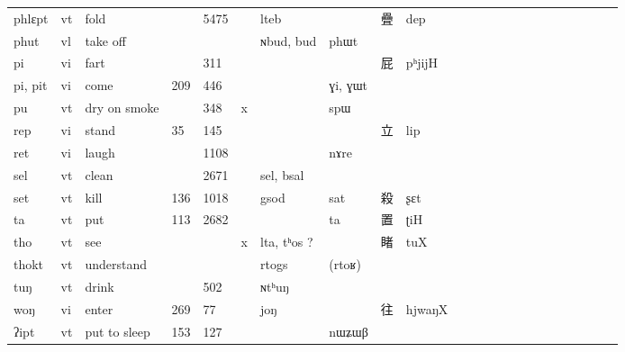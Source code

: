 \documentclass[oldfontcommands,oneside,a4paper,11pt]{article}
\newcommand{\ipa}[1]{{\phon #1}} %
\newcommand{\zh}[1]{{\cn #1}}
\begin{document}
\begin{table}[H]
{\begin{tabular}{lllllllllllllllllllllll}
\ipa{phlɛpt}   &  	vt   &  	fold   &  	\tiny    &  	\tiny 5475   &  	   &  	\ipa{lteb}   &  	\ipa{}   &  	\zh{疊}   &  	\ipa{dep}   \\  		
\ipa{phut}   &  	vl   &  	take off   &  	\tiny    &  	\tiny    &  	   &  	\ipa{ɴbud, bud}   &  	\ipa{phɯt}   &  	\zh{}   &  	\ipa{}   \\  		
\ipa{pi}   &  	vi   &  	fart   &  	\tiny    &  	\tiny 311   &  	   &  	\ipa{}   &  	\ipa{}   &  	\zh{屁}   &  	\ipa{pʰjijH}   \\  		
\ipa{pi, pit}   &  	vi   &  	come   &  	\tiny 209   &  	\tiny 446   &  	   &  	\ipa{}   &  	\ipa{ɣi, ɣɯt}   &  	\zh{}   &  	\ipa{}   \\  		
\ipa{pu}   &  	vt   &  	dry on smoke   &  	\tiny    &  	\tiny 348   &  	x   &  	\ipa{}   &  	\ipa{spɯ}   &  	\zh{}   &  	\ipa{}   \\  		
\ipa{rep}   &  	vi   &  	stand   &  	\tiny 35   &  	\tiny 145   &  	   &  	\ipa{}   &  	\ipa{}   &  	\zh{立}   &  	\ipa{lip}   \\  		
\ipa{ret}   &  	vi   &  	laugh   &  	\tiny    &  	\tiny 1108   &  	   &  	\ipa{}   &  	\ipa{nɤre}   &  	\zh{}   &  	\ipa{}   \\  		
\ipa{sel}   &  	vt   &  	clean   &  	\tiny    &  	\tiny 2671   &  	   &  	\ipa{sel, bsal}   &  	\ipa{}   &  	\zh{}   &  	\ipa{}   \\  		
\ipa{set}   &  	vt   &  	kill   &  	\tiny 136   &  	\tiny 1018   &  	   &  	\ipa{gsod}   &  	\ipa{sat}   &  	\zh{殺}   &  	\ipa{ʂɛt}   \\  		
\ipa{ta}   &  	vt   &  	put   &  	\tiny 113   &  	\tiny 2682   &  	   &  	\ipa{}   &  	\ipa{ta}   &  	\zh{置}   &  	\ipa{ʈiH}   \\  		
\ipa{tho}   &  	vt   &  	see   &  	\tiny     &  	\tiny    &  	x   &  	\ipa{lta,  tʰos ?}   &  	\ipa{}   &  	\zh{睹}   &  	\ipa{tuX}   \\  		
\ipa{thokt}   &  	vt   &  	understand   &  	\tiny    &  	\tiny    &  	   &  	\ipa{rtogs}   &  	\ipa{(rtoʁ)}   &  	\zh{}   &  	\ipa{}   \\  		
\ipa{tuŋ}   &  	vt   &  	drink   &  	\tiny    &  	\tiny 502   &  	   &  	\ipa{ɴtʰuŋ}   &  	\ipa{}   &  	\zh{}   &  	\ipa{}   \\  		
\ipa{woŋ}   &  	vi   &  	enter   &  	\tiny 269   &  	\tiny 77   &  	   &  	\ipa{joŋ}   &  	\ipa{}   &  	\zh{往}   &  	\ipa{hjwaŋX}   \\  		
\ipa{ʔipt}   &  	vt   &  	put to sleep   &  	\tiny 153   &  	\tiny 127   &  	   &  	\ipa{}   &  	\ipa{nɯʑɯβ}   &  	\zh{}   &  	\ipa{}   \\  		
\bottomrule
\end{tabular}}
\end{table}
\end{document}
